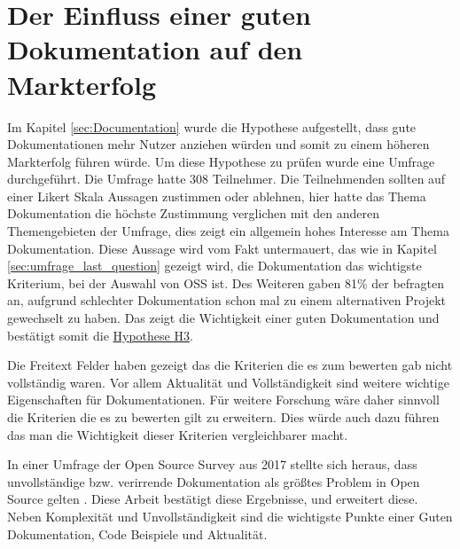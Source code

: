 \section{Der Einfluss einer guten Dokumentation auf den Markterfolg} 

Im Kapitel \ref{sec:Documentation} wurde die Hypothese aufgestellt, dass gute Dokumentationen mehr 
Nutzer anziehen würden und somit zu einem höheren Markterfolg führen würde. 
Um diese Hypothese zu prüfen wurde eine Umfrage durchgeführt. Die Umfrage hatte 308 Teilnehmer. 
Die Teilnehmenden sollten auf einer Likert Skala Aussagen zustimmen oder ablehnen, hier hatte das 
Thema Dokumentation die höchste Zustimmung verglichen mit den anderen Themengebieten der Umfrage, 
dies zeigt ein allgemein hohes Interesse am Thema Dokumentation. Diese Aussage wird vom Fakt 
untermauert, das wie in Kapitel \ref{sec:umfrage_last_question} gezeigt wird, die Dokumentation 
das wichtigste Kriterium, bei der Auswahl von OSS ist. Des Weiteren gaben 81\% der befragten an, 
aufgrund schlechter Dokumentation schon mal zu einem alternativen Projekt gewechselt zu haben.
Das zeigt die Wichtigkeit einer guten Dokumentation und bestätigt somit die 
\hyperref[H:3]{Hypothese H3}.


Die Freitext Felder haben gezeigt das die Kriterien die es zum bewerten gab nicht vollständig waren. 
Vor allem Aktualität und Vollständigkeit sind weitere wichtige Eigenschaften für Dokumentationen.
Für weitere Forschung wäre daher sinnvoll die Kriterien die es zu bewerten gilt zu erweitern.
Dies würde auch dazu führen das man die Wichtigkeit dieser Kriterien vergleichbarer macht.

In einer Umfrage der Open Source Survey aus 2017 stellte sich heraus, dass unvollständige bzw. 
verirrende Dokumentation als größtes Problem in Open Source gelten \cite{GitHubOpenSourceSurvey2017}.
Diese Arbeit bestätigt diese Ergebnisse, und erweitert diese. Neben Komplexität und Unvollständigkeit
sind die wichtigste Punkte einer Guten Dokumentation, Code Beispiele und Aktualität.


